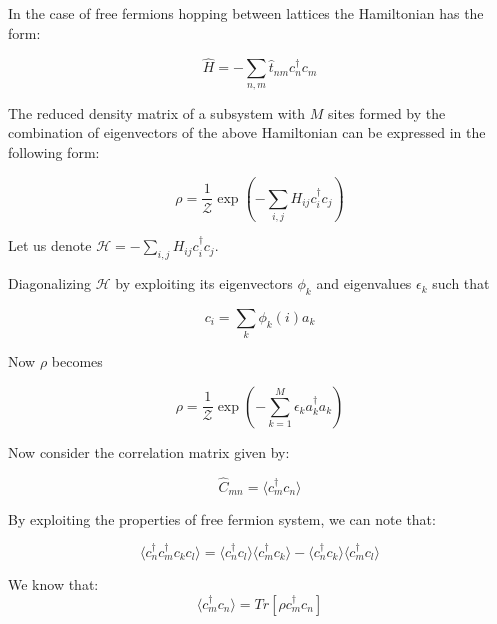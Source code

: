 \documentclass[11pt,a4paper]{article}
\begin{document}
In the case of free fermions hopping between lattices the Hamiltonian has the form: 

\begin{equation}\label{key}
\hat{H}  = - \sum_{n,m} \hat{t}_{nm}c_{n}^\dagger c_{m}
\end{equation}

The reduced density matrix of a subsystem with $ M $ sites formed by the combination of eigenvectors of the above Hamiltonian can be expressed in the following form:

\begin{equation}\label{key}
\rho  = \dfrac{1}{\mathcal{Z}} \exp(-\sum_{i,j}H_{ij}c_{i}^\dagger c_{j})
\end{equation}

Let us denote $ \mathcal{H} = -\sum_{i,j}H_{ij}c_{i}^\dagger c_{j}  $. 

Diagonalizing $ \mathcal{H} $ by exploiting its eigenvectors $ \phi_{k} $ and eigenvalues $ \epsilon_{k} $   such that 

\begin{equation}\label{key}
c_{i} = \sum_{k} \phi_{k}(i) a_{k}
\end{equation}

Now $ \rho $ becomes 

\begin{equation}\label{kedy}
\rho  = \dfrac{1}{\mathcal{Z}} \exp(-\sum_{k = 1}^{M}\epsilon_{k}a_{k}^\dagger a_{k})
\end{equation}

Now consider the correlation matrix given by:

\begin{equation}
\hat{C}_{mn} = \langle c_{m}^\dagger c_{n}\rangle
\end{equation}



By exploiting the properties of free fermion system, we can note that:

\begin{equation}
\langle c_{n}^\dagger c_{m}^\dagger c_{k}c_{l}\rangle = \langle c_{n}^\dagger c_{l}\rangle \langle c_{m}^\dagger c_{k}\rangle-\langle c_{n}^\dagger c_{k}\rangle \langle c_{m}^\dagger c_{l}\rangle
\end{equation}

We know that:
\begin{equation}
\langle c_{m}^\dagger c_{n}\rangle = Tr[\rho c_{m}^\dagger c_{n}]
\end{equation}
\end{document}
